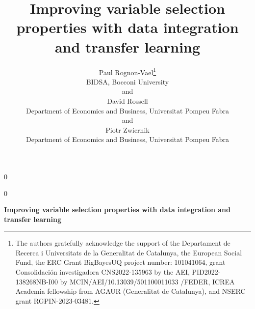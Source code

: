 \documentclass[
  12pt]{article}
\newcommand{\anon}{0}
\begin{document}
\def\spacingset#1{\renewcommand{\baselinestretch}%
{#1}\small\normalsize} \spacingset{1}




\anon
{
  \title{\bf Improving variable selection properties with data integration and transfer learning}
  \author{Paul Rognon-Vael\thanks{
    The authors gratefully acknowledge the support of the Departament de Recerca i Universitats de la Generalitat de Catalunya, the European Social Fund, the ERC Grant BigBayesUQ project number: 101041064, grant Consolidaci\'on investigadora CNS2022-135963 by the AEI, PID2022-138268NB-I00 by MCIN/AEI/10.13039/501100011033 /FEDER, ICREA Academia fellowship from AGAUR (Generalitat de Catalunya), and NSERC grant RGPIN-2023-03481.}\hspace{.2cm}\\
    BIDSA, Bocconi University\\
    and \\
    David Rossell \\
    Department of Economics and Business, Universitat Pompeu Fabra \\
    and \\
    Piotr Zwiernik \\
    Department of Economics and Business, Universitat Pompeu Fabra}
  \maketitle
} \fi

\anon
{
  \bigskip
  \bigskip
  \bigskip
  \begin{center}
    {\LARGE\bf Improving variable selection properties with data integration and transfer learning}
\end{center}
  \medskip
} \fi
\end{document}

